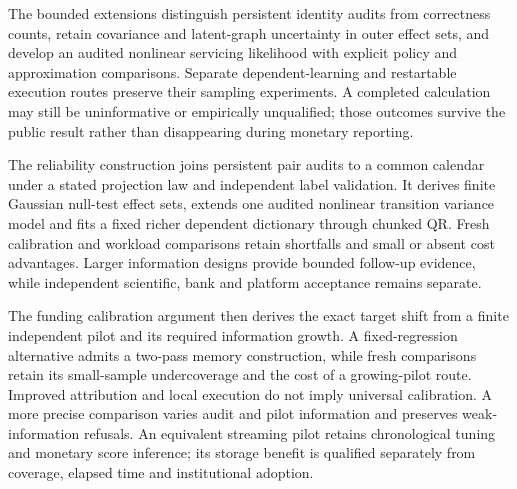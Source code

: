 \documentclass[11pt,a4paper,openany]{book}
\begin{document}
The bounded extensions distinguish persistent identity audits from correctness
counts, retain covariance and latent-graph uncertainty in outer effect sets,
and develop an audited nonlinear servicing likelihood with explicit policy
and approximation comparisons. Separate dependent-learning and restartable
execution routes preserve their sampling experiments. A completed calculation
may still be uninformative or empirically unqualified; those outcomes survive
the public result rather than disappearing during monetary reporting.

The reliability construction joins persistent pair audits to a common calendar
under a stated projection law and independent label validation. It derives
finite Gaussian null-test effect sets, extends one audited nonlinear transition
variance model and fits a fixed richer dependent dictionary through chunked QR.
Fresh calibration and workload comparisons retain shortfalls and small or absent
cost advantages. Larger information designs provide bounded follow-up evidence,
while independent scientific, bank and platform acceptance remains separate.

The funding calibration argument then derives the exact target shift from a
finite independent pilot and its required information growth. A fixed-regression
alternative admits a two-pass memory construction, while fresh comparisons
retain its small-sample undercoverage and the cost of a growing-pilot route.
Improved attribution and local execution do not imply universal calibration.
A more precise comparison varies audit and pilot information and preserves
weak-information refusals. An equivalent streaming pilot retains chronological
tuning and monetary score inference; its storage benefit is qualified separately
from coverage, elapsed time and institutional adoption.

\begingroup\setlength{\parskip}{0pt}\tableofcontents\endgroup
\mainmatter
\end{document}
